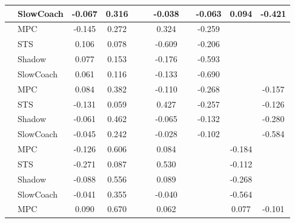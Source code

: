 \begin{tabular}{|l|l|*{9}{c|}}
                                                           & SlowCoach &   -0.067 &     0.316 &        &     & -0.038 &     &  -0.063 &   0.094 &   -0.421 \\
\midrule
[True, True, False, False, True, False, True, False, False] & MPC &   -0.145 &     0.272 &        &     &  0.324 &     &  -0.259 &      &       \\
                                                           & STS &    0.106 &     0.078 &        &     & -0.609 &     &  -0.206 &      &       \\
                                                           & Shadow &    0.077 &     0.153 &        &     & -0.176 &     &  -0.593 &      &       \\
                                                           & SlowCoach &    0.061 &     0.116 &        &     & -0.133 &     &  -0.690 &      &       \\
\midrule
[True, True, False, False, True, False, True, False, True] & MPC &    0.084 &     0.382 &        &     & -0.110 &     &  -0.268 &      &   -0.157 \\
                                                           & STS &   -0.131 &     0.059 &        &     &  0.427 &     &  -0.257 &      &   -0.126 \\
                                                           & Shadow &   -0.061 &     0.462 &        &     & -0.065 &     &  -0.132 &      &   -0.280 \\
                                                           & SlowCoach &   -0.045 &     0.242 &        &     & -0.028 &     &  -0.102 &      &   -0.584 \\
\midrule
[True, True, False, False, True, False, False, True, False] & MPC &   -0.126 &     0.606 &        &     &  0.084 &     &      &  -0.184 &       \\
                                                           & STS &   -0.271 &     0.087 &        &     &  0.530 &     &      &  -0.112 &       \\
                                                           & Shadow &   -0.088 &     0.556 &        &     &  0.089 &     &      &  -0.268 &       \\
                                                           & SlowCoach &   -0.041 &     0.355 &        &     & -0.040 &     &      &  -0.564 &       \\
\midrule
[True, True, False, False, True, False, False, True, True] & MPC &    0.090 &     0.670 &        &     &  0.062 &     &      &   0.077 &   -0.101 \\

\end{tabular}
